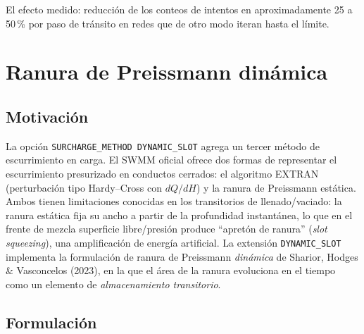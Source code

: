 \documentclass[11pt,a4paper]{article}
\begin{document}
El efecto medido: reducción de los conteos de intentos en aproximadamente 25 a
50\,\% por paso de tránsito en redes que de otro modo iteran hasta el límite.

\section{Ranura de Preissmann dinámica}
\label{sec:dps}

\subsection{Motivación}

La opción \texttt{SURCHARGE\_METHOD DYNAMIC\_SLOT} agrega un tercer método de
escurrimiento en carga. El SWMM oficial ofrece dos formas de representar el
escurrimiento presurizado
en conductos cerrados: el algoritmo EXTRAN (perturbación tipo Hardy--Cross con
$dQ/dH$) y la ranura de Preissmann estática. Ambos tienen limitaciones
conocidas en los transitorios de llenado/vaciado: la ranura estática fija su
ancho a partir de la profundidad instantánea, lo que en el frente de mezcla
superficie libre/presión produce ``apretón de ranura'' (\emph{slot squeezing}),
una amplificación de energía artificial. La extensión \texttt{DYNAMIC\_SLOT}
implementa la formulación de ranura de Preissmann \emph{dinámica} de Sharior,
Hodges \& Vasconcelos (2023), en la que el área de la ranura evoluciona en el
tiempo como un elemento de \emph{almacenamiento transitorio}.

\subsection{Formulación}
\end{document}
